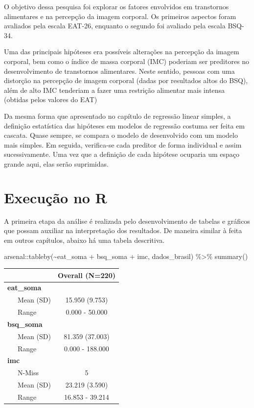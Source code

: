 \documentclass[
]{book}
\newenvironment{Shaded}{\begin{snugshade}}{\end{snugshade}}
\newcommand{\FunctionTok}[1]{\textcolor[rgb]{0.00,0.00,0.00}{#1}}
\newcommand{\NormalTok}[1]{#1}
\newcommand{\SpecialCharTok}[1]{\textcolor[rgb]{0.00,0.00,0.00}{#1}}
\begin{document}
O objetivo dessa pesquisa foi explorar os fatores envolvidos em transtornos alimentares e na percepção da imagem corporal. Os primeiros aspectos foram avaliados pela escala EAT-26, enquanto o segundo foi avaliado pela escala BSQ-34.

Uma das principais hipóteses era possíveis alterações na percepção da imagem corporal, bem como o índice de massa corporal (IMC) poderiam ser preditores no desenvolvimento de transtornos alimentares. Neste sentido, pessoas com uma distorção na percepção de imagem corporal (dadas por resultados altos do BSQ), além de alto IMC tenderiam a fazer uma restrição alimentar mais intensa (obtidas pelos valores do EAT)

Da mesma forma que apresentado no capítulo de regressão linear simples, a definição estatística das hipóteses em modelos de regressão costuma ser feita em cascata. Quase sempre, se compara o modelo de desenvolvido com um modelo mais simples. Em seguida, verifica-se cada preditor de forma individual e assim sucessivamente. Uma vez que a definição de cada hipótese ocuparia um espaço grande aqui, elas serão suprimidas.

\hypertarget{execuuxe7uxe3o-no-r-15}{%
\section{Execução no R}\label{execuuxe7uxe3o-no-r-15}}

A primeira etapa da análise é realizada pelo desenvolvimento de tabelas e gráficos que possam auxiliar na interpretação dos resultados. De maneira similar à feita em outros capítulos, abaixo há uma tabela descritiva.

\begin{Shaded}
\begin{Highlighting}[]
\NormalTok{arsenal}\SpecialCharTok{::}\FunctionTok{tableby}\NormalTok{(}\SpecialCharTok{\textasciitilde{}}\NormalTok{eat\_soma }\SpecialCharTok{+}\NormalTok{ bsq\_soma }\SpecialCharTok{+}\NormalTok{ imc, dados\_brasil) }\SpecialCharTok{\%\textgreater{}\%} 
  \FunctionTok{summary}\NormalTok{() }
\end{Highlighting}
\end{Shaded}

\begin{longtable}[]{@{}lc@{}}
\toprule
& Overall (N=220) \\
\midrule
\endhead
\textbf{eat\_soma} & \\
~~~Mean (SD) & 15.950 (9.753) \\
~~~Range & 0.000 - 50.000 \\
\textbf{bsq\_soma} & \\
~~~Mean (SD) & 81.359 (37.003) \\
~~~Range & 0.000 - 188.000 \\
\textbf{imc} & \\
~~~N-Miss & 5 \\
~~~Mean (SD) & 23.219 (3.590) \\
~~~Range & 16.853 - 39.214 \\
\bottomrule
\end{longtable}
\end{document}
